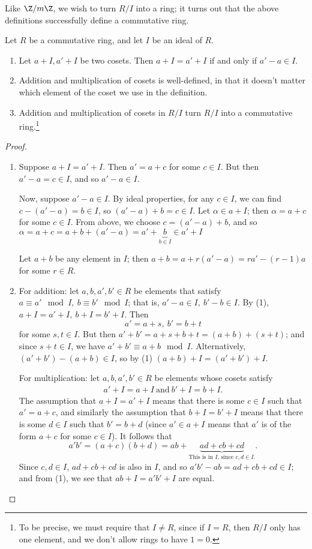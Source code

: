 \documentclass[math1530-lecture-notes]{subfiles}
\begin{document}
Like $\Z / m\Z$, we wish to turn $R / I$ into a ring; it turns out that the above definitions
successfully define a commutative ring.

\begin{proposition}[]{}
  Let $R$ be a commutative ring, and let $I$ be an ideal of $R$.
  \begin{enumerate}
    \item Let $a+I,a'+I$ be two cosets. Then $a+I=a'+I$ if and only if $a'-a\in I$.
    \item Addition and multiplication of cosets is well-defined, in that it doesn't matter which
      element of the coset we use in the definition.
    \item Addition and multiplication of cosets in $R / I$ turn $R / I$ into a commutative
      ring.\footnote{To be precise, we must require that $I\neq R$, since if $I=R$, then $R/I$ only
      has one element, and we don't allow rings to have $1=0$.}
  \end{enumerate}
\end{proposition}
\begin{proof}[Proof]
  \begin{enumerate}
    \item Suppose $a+I=a'+I$. Then $a'=a+c$ for some $c\in I$. But then $a'-a=c\in I$, and so
      $a'-a\in I$.

      Now, suppose $a'-a\in I$. By ideal properties, for any $c\in I$, we can find $c-(a'-a)=b\in
      I$, so $(a'-a)+b=c\in I$. Let $\alpha\in a+I$; then $ \alpha=a+c$ for some $c\in I$. From
      above, we choose $c=(a'-a)+b$, and so $ \alpha=a+c=a+b+(a'-a)=a'+\underbrace{b}_\text{$b\in I$}\in a'+I$

      Let $a+b$ be any element in
      $I$; then $a+b=a+r(a'-a)=ra'-(r-1)a$ for some $r\in R$.
    \item For addition: let $a,b,a',b'\in R$ be elements that satisfy $a\equiv a'\mod{I},\ b\equiv
      b'\mod{I}$; that is, $a'-a\in I,\ b'-b\in I$. By (1), $a+I=a'+I,\ b+I=b'+I$. Then \[
        a'=a+s,\ b'=b+t
      \] for some $s,t\in I$. But then $a'+b'=a+s+b+t=(a+b)+(s+t)$; and since $s+t\in I$, we have
      $a'+b'\equiv a+b\mod{I}$. Alternatively, $(a'+b')-(a+b)\in I$, so by (1) $(a+b)+I=(a'+b')+I$.

      For multiplication: let $a,b,a',b'\in R$ be elements whose cosets satisfy
      \begin{align*}
        a'+I=a+I ~\text{and}~b'+I=b+I
      .\end{align*} The assumption that $a+I=a'+I$ means that there is some $c\in I$ such that $a'=a+c$,
      and similarly the assumption that $b+I=b'+I$ means that there is some $d\in I$ such that $b'=b+d$
      (since $a'\in a+I$ means that $a'$ is of the form $a+c$ for some $c\in I$). It follows that \[
        a'b'=(a+c)(b+d)=ab+\underbrace{ad+cb+cd}_\text{This is in $I$, since $c,d\in I$.}
      .\] Since $c,d\in I$, $ad+cb+cd$ is also in $I$, and so $a'b'-ab=ad+cb+cd \in I$; and from (1), we
      see that $ab+I=a'b'+I$ are equal.
  \end{enumerate}
\end{proof}
\end{document}
